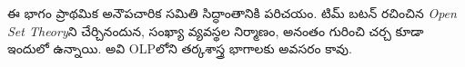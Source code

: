 \documentclass[../../include/open-logic-part]{subfiles}
\begin{document}

\begin{editorial}
  ఈ భాగం ప్రాథమిక అనౌపచారిక సమితి సిద్ధాంతానికి పరిచయం.
  టిమ్ బటన్ రచించిన \emph{Open Set Theory}ని చేర్చినందున,
  సంఖ్యా వ్యవస్థల నిర్మాణం, అనంతం గురించి చర్చ కూడా ఇందులో
  ఉన్నాయి. అవి OLPలోని తర్కశాస్త్ర భాగాలకు అవసరం కావు.
\end{editorial}







\OLEndPartHook
\end{document}
